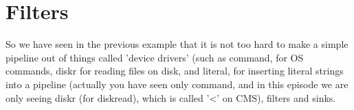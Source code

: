 \chapter{Filters}
So we have seen in the previous example that it is not too hard to make a simple pipeline out of things called 'device drivers' (such as command, for OS commands, diskr for reading files on disk, and literal, for inserting literal strings into a pipeline (actually you have seen only command, and in this episode we are only seeing diskr (for diskread), which is called '<' on CMS), filters and sinks.

